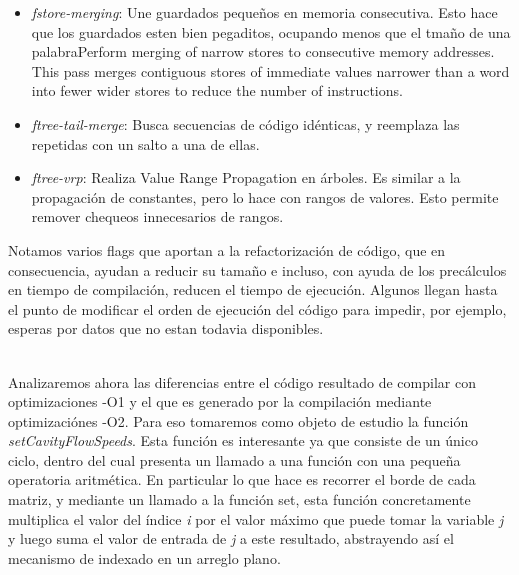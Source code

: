 \begin{itemize}
	\item \textit{fstore-merging}: Une guardados pequeños en memoria consecutiva. Esto hace que los guardados esten bien pegaditos, ocupando menos que el tmaño de una palabraPerform merging of narrow stores to consecutive memory addresses. This pass merges contiguous stores of immediate values narrower than a word into fewer wider stores to reduce the number of instructions.

	\item \textit{ftree-tail-merge}: Busca secuencias de código idénticas, y reemplaza las repetidas con un salto a una de ellas.

	\item \textit{ftree-vrp}: Realiza Value Range Propagation en árboles. Es similar a la propagación de constantes, pero  lo hace con rangos de valores. Esto permite remover chequeos innecesarios de rangos. 
\end{itemize}

Notamos varios flags que aportan a la refactorización de código, que en consecuencia, ayudan a reducir su tamaño e incluso, con ayuda de los precálculos en tiempo de compilación, reducen el tiempo de ejecución. Algunos llegan hasta el punto de modificar el orden de ejecución del código para impedir, por ejemplo, esperas por datos que no estan todavia disponibles.

~\\

Analizaremos ahora las diferencias entre el código resultado de compilar con optimizaciones -O1 y el que es generado por la compilación mediante optimizaciónes -O2. Para eso tomaremos como objeto de estudio la función \textit{setCavityFlowSpeeds}. Esta función es interesante ya que consiste de un único ciclo, dentro del cual presenta un llamado a una función con una pequeña operatoria aritmética. En particular lo que hace es recorrer el borde de cada matriz, y mediante un llamado a la función set, esta función concretamente multiplica el valor del índice \textit{i} por el valor máximo que puede tomar la variable \textit{j} y luego suma el valor de entrada de \textit{j} a este resultado, abstrayendo así el mecanismo de indexado en un arreglo plano. 

~\\

